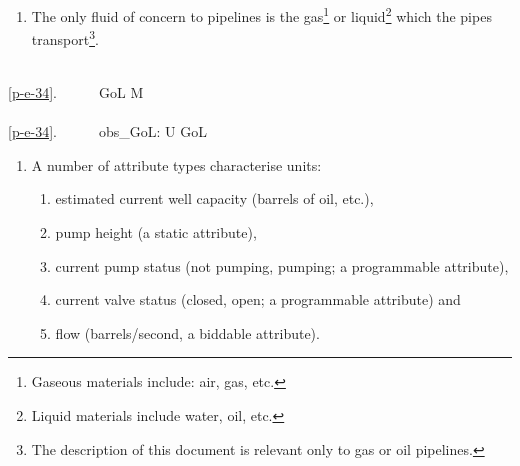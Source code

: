 
\begin{enumerate}\setei
\item \label{p-e-34} The only fluid of concern to pipelines is the
                     gas\footnote{\LLLL Gaseous materials include: air, gas,
                     etc.} or liquid\footnote{\LLLL Liquid materials include
                     water, oil, etc.} which the pipes
                     transport\footnote{\LLLL The description of this
                     document is relevant only to gas or oil pipelines.}.
\savei\end{enumerate}

\bp
\>\ \\
\ref{p-e-34}.\ \ \ \ \ \ GoL {\LBRACKET} {\EQ} M {\RBRACKET} \\
\>\ \\
\ref{p-e-34}.\ \ \ \ \ \ obs\_GoL: U {\RIGHTARROW} GoL\ \ 
\ep

\LLLL

\HHHH


\begin{enumerate}\setei
\item A number of attribute types characterise units:
\begin{enumerate}
\item \label{pa01x} estimated current well capacity (barrels of oil, etc.),
\item \label{pa03x} pump height (a static attribute), 
\item \label{pa04x} current pump status (not pumping, pumping; a programmable attribute),
\item \label{pa05x} current valve status (closed, open; a programmable attribute) and
\item \label{pa06x} flow (barrels/second, a biddable attribute).
\end{enumerate}
\savei\end{enumerate}

\mnewfoil\LLLL\HHHH%


